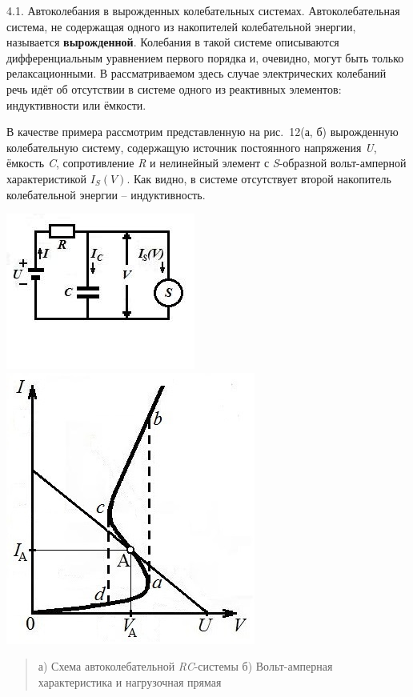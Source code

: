 \documentclass[]{article}
\begin{document}
4.1. Автоколебания в вырожденных колебательных системах.
Автоколебательная система, не содержащая одного из накопителей
колебательной энергии, называется \textbf{вырожденной}. Колебания в
такой системе описываются дифференциальным уравнением первого порядка и,
очевидно, могут быть только релаксационными. В рассматриваемом здесь
случае электрических колебаний речь идёт об отсутствии в системе одного
из реактивных элементов: индуктивности или ёмкости.

В качестве примера рассмотрим представленную на рис.~12(а, б)
вырожденную колебательную систему, содержащую источник постоянного
напряжения \emph{U}, ёмкость \emph{C}, сопротивление \emph{R} и
нелинейный элемент с \emph{S}-образной вольт-амперной характеристикой
\({{I}_{S}}(V)\). Как видно, в системе отсутствует второй накопитель
колебательной энергии -- индуктивность.

\includegraphics{Images/media/image18.jpeg}
\includegraphics{Images/media/image19.jpeg}

\begin{quote}
а) Схема автоколебательной \emph{RC}-системы б) Вольт-амперная
характеристика и нагрузочная прямая
\end{quote}
\end{document}
